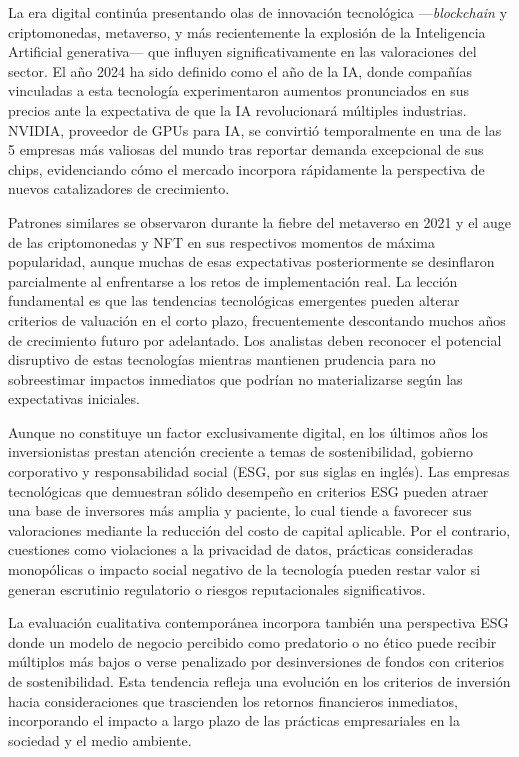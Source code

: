 La era digital continúa presentando olas de innovación tecnológica ---\emph{blockchain} y criptomonedas, metaverso, y más recientemente la explosión de la Inteligencia Artificial generativa--- que influyen significativamente en las valoraciones del sector. El año 2024 ha sido definido como el año de la IA, donde compañías vinculadas a esta tecnología experimentaron aumentos pronunciados en sus precios ante la expectativa de que la IA revolucionará múltiples industrias. NVIDIA, proveedor de GPUs para IA, se convirtió temporalmente en una de las 5 empresas más valiosas del mundo tras reportar demanda excepcional de sus chips, evidenciando cómo el mercado incorpora rápidamente la perspectiva de nuevos catalizadores de crecimiento.

Patrones similares se observaron durante la fiebre del metaverso en 2021 y el auge de las criptomonedas y NFT en sus respectivos momentos de máxima popularidad, aunque muchas de esas expectativas posteriormente se desinflaron parcialmente al enfrentarse a los retos de implementación real. La lección fundamental es que las tendencias tecnológicas emergentes pueden alterar criterios de valuación en el corto plazo, frecuentemente descontando muchos años de crecimiento futuro por adelantado. Los analistas deben reconocer el potencial disruptivo de estas tecnologías mientras mantienen prudencia para no sobreestimar impactos inmediatos que podrían no materializarse según las expectativas iniciales.

Aunque no constituye un factor exclusivamente digital, en los últimos años los inversionistas prestan atención creciente a temas de sostenibilidad, gobierno corporativo y responsabilidad social (ESG, por sus siglas en inglés). Las empresas tecnológicas que demuestran sólido desempeño en criterios ESG pueden atraer una base de inversores más amplia y paciente, lo cual tiende a favorecer sus valoraciones mediante la reducción del costo de capital aplicable. Por el contrario, cuestiones como violaciones a la privacidad de datos, prácticas consideradas monopólicas o impacto social negativo de la tecnología pueden restar valor si generan escrutinio regulatorio o riesgos reputacionales significativos.

La evaluación cualitativa contemporánea incorpora también una perspectiva ESG donde un modelo de negocio percibido como predatorio o no ético puede recibir múltiplos más bajos o verse penalizado por desinversiones de fondos con criterios de sostenibilidad. Esta tendencia refleja una evolución en los criterios de inversión hacia consideraciones que trascienden los retornos financieros inmediatos, incorporando el impacto a largo plazo de las prácticas empresariales en la sociedad y el medio ambiente.

